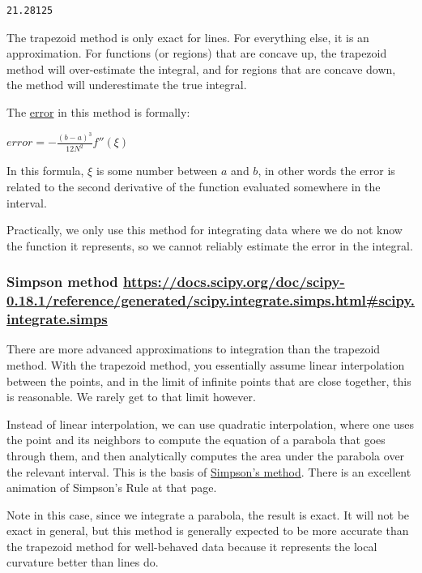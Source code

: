\documentclass[11pt]{article}
\begin{document}
\begin{verbatim}
21.28125
\end{verbatim}

The trapezoid method is only exact for lines. For everything else, it is an approximation. For functions (or regions) that are concave up, the trapezoid method will over-estimate the integral, and for regions that are concave down, the method will underestimate the true integral.

The \href{https://en.wikipedia.org/wiki/Trapezoidal\_rule\#Error\_analysis}{error} in this method is formally:

\(error = - \frac{(b - a)^3}{12 N^2} f''(\xi)\)

In this formula, \(\xi\) is some number between \(a\) and \(b\), in other words the error is related to the second derivative of the function evaluated somewhere in the interval.

Practically, we only use this method for integrating data where we do not know the function it represents, so we cannot reliably estimate the error in the integral.

\subsubsection{Simpson method \url{https://docs.scipy.org/doc/scipy-0.18.1/reference/generated/scipy.integrate.simps.html\#scipy.integrate.simps}}
\label{sec:org3cca5bb}

There are more advanced approximations to integration than the trapezoid method. With the trapezoid method, you essentially assume linear interpolation between the points, and in the limit of infinite points that are close together, this is reasonable. We rarely get to that limit however.

Instead of linear interpolation, we can use quadratic interpolation, where one uses the point and its neighbors to compute the equation of a parabola that goes through them, and then analytically computes the area under the parabola over the relevant interval. This is the basis of \href{https://en.wikipedia.org/wiki/Simpson\%27s\_rule}{Simpson's method}. There is an excellent animation of Simpson's Rule at that page.


Note in this case, since we integrate a parabola, the result is exact. It will not be exact in general, but this method is generally expected to be more accurate than the trapezoid method for well-behaved data because it represents the local curvature better than lines do.
\end{document}
